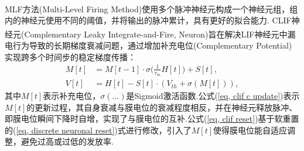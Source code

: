 \documentclass[10.5pt,compsoc,UTF8]{CjC}
\theoremstyle{mystyle}
\newcommand{\upcite}[1]{\textsuperscript{\cite{#1}}}
\begin{document}
\begin{multicols}{1}
MLF方法(Multi-Level Firing Method)\upcite{ijcai2022p343}使用多个脉冲神经元构成一个神经元组，组内的神经元使用不同的阈值，并将输出的脉冲累计，具有更好的拟合能力.
CLIF神经元(Complementary Leaky Integrate-and-Fire, Neuron)\upcite{huang2024clif}旨在解决LIF神经元中漏电行为导致的长期梯度衰减问题，通过增加补充电位(Complementary Potential)实现跨多个时间步的稳定梯度传播：
\begin{align}
	M[t] &= M[t-1] \cdot \sigma\Big(\frac{1}{\tau_{m}}H[t]\Big) + S[t], \label{eq, clif c update} \\
	V[t] &= H[t] - S[t] \cdot (V_{th} + \sigma(M[t])), \label{eq, clif reset}
\end{align}
其中$M[t]$表示补充电位，$\sigma(...)$是Sigmoid激活函数.公式(\ref{eq, clif c update})表示$M[t]$的更新过程，其自身衰减与膜电位的衰减程度相反，并在神经元释放脉冲、即膜电位瞬间下降时自增，实现了与膜电位的互补.公式(\ref{eq, clif reset})基于软重置的(\ref{eq, discrete neuronal reset})式进行修改，引入了$M[t]$使得膜电位能自适应调整，避免过高或过低的发放率.


\end{multicols}
\end{document}
